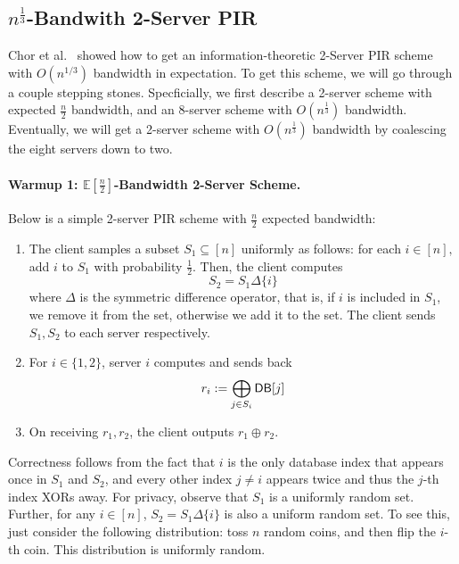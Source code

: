 \subsection{$n^{\frac{1}{3}}$-Bandwith 2-Server PIR} %
Chor et al.~\cite{chor1998private}
showed how to 
get an information-theoretic 2-Server PIR scheme
with $O(n^{1/3})$ bandwidth in expectation.
To get this scheme, we 
will go through a couple stepping stones. 
Specficially, we first 
describe a 2-server scheme 
with expected $\frac{n}{2}$ bandwidth, 
and an 8-server scheme with $O(n^{\frac 1 3})$ bandwidth. 
Eventually, we will get a 2-server scheme 
with $O(n^{\frac 1 3})$ bandwidth
by coalescing the 
eight servers down to two.

\paragraph{Warmup 1: $\mathbb{E}[\frac{n}{2}]$-Bandwidth 2-Server Scheme.}
Below is a simple 2-server PIR scheme with 
$\frac{n}{2}$ expected bandwidth:
\begin{enumerate}
\item  
		The client samples 
a subset $S_{1} \subseteq [n]$ uniformly as follows: for each $i \in [n],$ add $i$ to $S_{1}$ with probability $\frac{1}{2}$. Then, the client computes
		\[S_{2} = S_{1} \Delta \{i\}\]
		where $\Delta$ is the symmetric difference operator, 
that is, if $i$ is included in $S_1$, we remove it from the set, otherwise we add it to the set. 
The client sends $S_{1},S_{2}$ to each server respectively.
\item 
For $i \in \{1, 2\}$, 
server $i$ computes and sends back
		\[r_{i} := \bigoplus_{j \in S_{i}} {\sf DB}[j]\]
\item 
		On receiving $r_1,r_2$, the client outputs $r_1 \oplus r_2$. 
\end{enumerate}
	
{Correctness} follows from the fact that $i$ is the only database 
index that appears once in $S_1$ and $S_2$, 
and every other index $j\neq i$ appears twice 
and thus the $j$-th index XORs away.
For privacy, 
observe 
that $S_1$ is a uniformly random set.
Further, for any $i \in [n]$, $S_2 = S_1 \Delta \{i\}$ 
is also a uniform random set. To see 
this, 
just consider the following distribution: toss 
$n$ random coins, and then flip the $i$-th coin. 
This distribution is uniformly random. %
        

